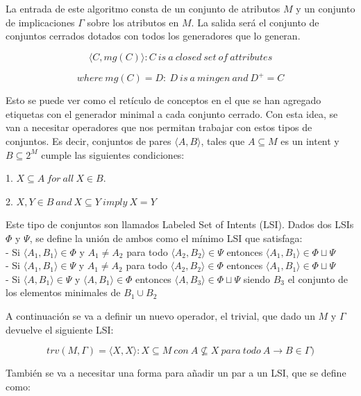     La entrada de este algoritmo consta de un conjunto de atributos \(M\) y un conjunto de implicaciones \(\Gamma\) sobre los atributos en \(M\).
    La salida ser\'a el conjunto de conjuntos cerrados dotados con todos los generadores que lo generan.

    \[
        {\langle C, mg(C) \rangle : C ~ is ~ a ~ closed ~ set ~ of ~ attributes}    
    \]

    \[
        where ~ mg(C) = {D: ~ D ~ is ~ a ~ mingen ~ and ~ D^+ = C}    
    \]

    Esto se puede ver como el ret\'iculo de conceptos en el que se han agregado etiquetas con el generador minimal a cada conjunto cerrado.
    Con esta idea, se van a necesitar operadores que nos permitan trabajar con estos tipos de conjuntos. Es decir, conjuntos de pares 
    \( \langle A, B \rangle \), tales que \( A \subseteq M\) es un intent y \( B \subseteq 2^M\) cumple las siguientes condiciones:

    1. \(X \subseteq A ~ for ~ all ~ X \in B\).

    2. \(X,Y \in B ~ and ~ X \subseteq Y ~ imply ~ X = Y\)

    Este tipo de conjuntos son llamados Labeled Set of Intents (LSI). Dados dos LSIs \(\Phi\) y \(\Psi\), se define la uni\'on de ambos como 
    el m\'inimo LSI que satisfaga:
    \\
    - Si \( \langle A_{1}, B_{1} \rangle \in \Phi \) y \(A_{1} \neq A_{2} \) para todo \( \langle A_{2}, B_{2} \rangle \in \Psi \) 
    entonces \( \langle A_{1}, B_{1} \rangle \in \Phi \sqcup \Psi \)
    \\
    - Si \( \langle A_{1}, B_{1} \rangle \in \Psi \) y \(A_{1} \neq A_{2} \) para todo \( \langle A_{2}, B_{2} \rangle \in \Phi \) 
    entonces \( \langle A_{1}, B_{1} \rangle \in \Phi \sqcup \Psi \)
    \\
    - Si \( \langle A, B_{1} \rangle \in \Psi \) y \( \langle A, B_{1} \rangle \in \Phi \) entonces \( \langle A, B_{3} \rangle \in \Phi \sqcup \Psi \) 
    siendo \(B_{3}\) el conjunto de los elementos minimales de \(B_{1} \cup B_{2}\)

    
    A continuaci\'on se va a definir un nuevo operador, el trivial, que dado un \(M\) y \(\Gamma\) devuelve el siguiente LSI:


    \[
        trv(M, \Gamma) = {\langle X, {X} \rangle: X \subseteq M ~ con ~ A \not \subseteq X ~ para ~ todo ~ A \rightarrow B \in \Gamma} )    
    \]

    Tambi\'en se va a necesitar una forma para a\~nadir un par a un LSI, que se define como:


